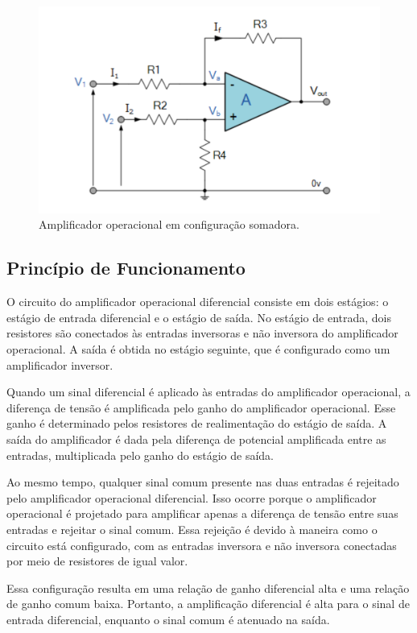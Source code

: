 \documentclass[12pt,twoside, a4paper, twocolumn]{article}
\begin{document}
\begin{figure}[h]
    \centering
    \includegraphics[width=1\columnwidth]{images/opamp_diferencial.png}
    \caption{Amplificador operacional em configuração somadora.}
\end{figure}


\subsection{Princípio de Funcionamento}


O circuito do amplificador operacional diferencial consiste em dois estágios: o estágio de entrada diferencial e o estágio de saída. No estágio de entrada, dois resistores são conectados às entradas inversoras e não inversora do amplificador operacional. A saída é obtida no estágio seguinte, que é configurado como um amplificador inversor.


Quando um sinal diferencial é aplicado às entradas do amplificador operacional, a diferença de tensão é amplificada pelo ganho do amplificador operacional. Esse ganho é determinado pelos resistores de realimentação do estágio de saída. A saída do amplificador é dada pela diferença de potencial amplificada entre as entradas, multiplicada pelo ganho do estágio de saída.


Ao mesmo tempo, qualquer sinal comum presente nas duas entradas é rejeitado pelo amplificador operacional diferencial. Isso ocorre porque o amplificador operacional é projetado para amplificar apenas a diferença de tensão entre suas entradas e rejeitar o sinal comum. Essa rejeição é devido à maneira como o circuito está configurado, com as entradas inversora e não inversora conectadas por meio de resistores de igual valor.


Essa configuração resulta em uma relação de ganho diferencial alta e uma relação de ganho comum baixa. Portanto, a amplificação diferencial é alta para o sinal de entrada diferencial, enquanto o sinal comum é atenuado na saída.
\end{document}
